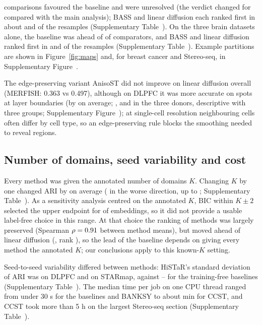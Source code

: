 \documentclass[unnumsec,webpdf,contemporary,large]{oup-authoring-template}
\newcommand{\figref}[1]{Figure~\ref{#1}}
\begin{document}
\nRobBetterExpert{} comparisons favoured the baseline and \nRobUnresExpert{} were unresolved (the verdict changed for \listExpertFlip{} compared with the main analysis); BASS and linear diffusion each ranked
first in about \pBestBassExpert{} and \pBestLinExpert{} of the resamples (Supplementary Table~\STstatsexpert). On the three brain datasets alone, the baseline was ahead of \nRobBetterBrain{} of \nRobTotBrain{} comparators, and BASS and linear diffusion ranked first in \pBestBassBrain{} and \pBestLinBrain{} of the resamples (Supplementary Table~\STstatsbrain). Example partitions are
shown in \figref{fig:maps} and, for breast cancer and Stereo-seq, in Supplementary Figure~\SFmapsnew.

The edge-preserving variant AnisoST did not improve on linear diffusion overall (MERFISH: 0.363 vs 0.497), although on DLPFC it
was more accurate on spots at layer boundaries (by \vsBoundMean{} on average; \vsBoundBrA, \vsBoundBrB{} and \vsBoundBrC{} in the three donors, descriptive with three
groups; Supplementary Figure~\SFboundary); at single-cell resolution neighbouring cells often differ by cell type, so an edge-preserving
rule blocks the smoothing needed to reveal regions.

\subsection{Number of domains, seed variability and cost}

Every method was given the annotated number of domains $K$. Changing $K$ by one changed ARI by \kOneAvg{} on average (\kOneMean{} in the
worse direction, up to \kOneMax{}; Supplementary Table~\STk). As a sensitivity analysis centred on the annotated $K$, BIC within $K\pm2$ selected the upper endpoint for \kBicEdge{} of \kN{}
embeddings, so it did not provide a usable label-free choice in this range. At that choice the ranking of methods was largely preserved (Spearman $\rho=0.91$ between method
means), but \kAboveLinBic{} moved ahead of linear diffusion (\kLinBic, rank \kLinBicRank), so the lead of the baseline depends on giving every method the annotated $K$; our conclusions apply to this known-$K$ setting.

Seed-to-seed variability differed between methods: HiSTaR's standard deviation of ARI was \sdHistarDlpfc{} on DLPFC and \sdHistarStarmap{} on
STARmap, against \sdBaseLo--\sdBaseHi{} for the training-free baselines (Supplementary Table~\STseeds). The median time per job on one CPU
thread ranged from under 30 s for the baselines and BANKSY to about \timeMinCcst{} min for CCST, and CCST took more than 5 h on the largest
Stereo-seq section (Supplementary Table~\STres).
\end{document}
